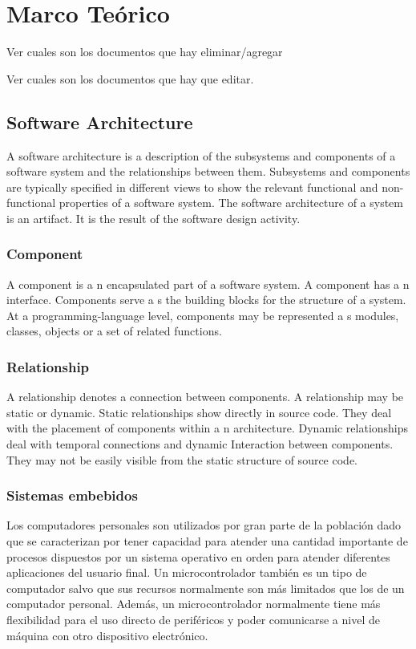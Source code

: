 \chapter{Marco Teórico}

Ver cuales son los documentos que hay eliminar/agregar

 Ver cuales son los documentos que hay que editar.

\section{Software Architecture}
A software architecture is a description of the subsystems and components of a software system and the relationships between them. Subsystems and components are typically specified in different views to show the relevant functional and non-functional properties of a software system. The software architecture of a system is an artifact. It is the result of the software design activity.

\subsection{Component}
A component is a n encapsulated part of a software system. A component has a n interface. Components serve a s the building blocks for the structure of a system. At a programming-language level, components may be represented a s modules, classes, objects or a set of related functions.

\subsection{Relationship}
A relationship denotes a connection between components. A relationship may be static or dynamic. Static relationships show directly in source code. They deal with the placement of components within a n architecture. Dynamic relationships deal with temporal connections and dynamic Interaction between components. They may not be easily visible from the static structure of source code.

\subsection{Sistemas embebidos}
Los computadores personales son utilizados por gran parte de la población dado que se caracterizan por tener capacidad para atender una cantidad importante de procesos dispuestos por un sistema operativo en orden para atender diferentes aplicaciones  del usuario final. Un microcontrolador tambi\'en es un tipo de computador salvo que sus recursos normalmente son más limitados que los de un computador personal. Además, un microcontrolador normalmente tiene más flexibilidad para el uso directo de perif\'ericos y poder comunicarse a nivel de máquina con otro dispositivo electrónico.

